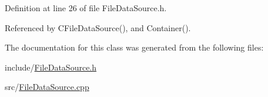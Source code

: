 Definition at line 26 of file File\+Data\+Source.\+h.



Referenced by C\+File\+Data\+Source(), and Container().



The documentation for this class was generated from the following files\+:\begin{DoxyCompactItemize}
\item 
include/\hyperlink{FileDataSource_8h}{File\+Data\+Source.\+h}\item 
src/\hyperlink{FileDataSource_8cpp}{File\+Data\+Source.\+cpp}\end{DoxyCompactItemize}
